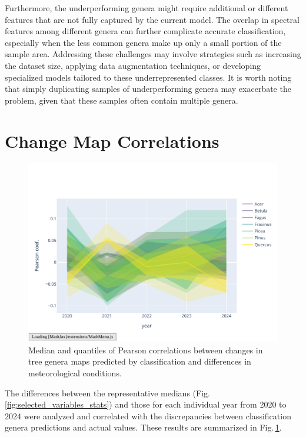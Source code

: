 Furthermore, the underperforming genera might require additional or different features that are not fully captured by the current model. The overlap in spectral features among different genera can further complicate accurate classification, especially when the less common genera make up only a small portion of the sample area. Addressing these challenges may involve strategies such as increasing the dataset size, applying data augmentation techniques, or developing specialized models tailored to these underrepresented classes. It is worth noting that simply duplicating samples of underperforming genera may exacerbate the problem, given that these samples often contain multiple genera.

\section{Change Map Correlations}

\begin{figure}[ht]
    \centering
    \includegraphics[width=0.98\linewidth, trim={10pt 20pt 10pt 40pt}, clip]{figures/figures_climate/genus_corr.pdf}
    \caption{Median and quantiles of Pearson correlations between changes in tree genera maps predicted by classification and differences in meteorological conditions.}
    \label{fig:genus_corr}
\end{figure}

The differences between the representative medians (Fig.\,\ref{fig:selected_variables_stats}) and those for each individual year from 2020 to 2024 were analyzed and correlated with the discrepancies between classification genera predictions and actual values. These results are summarized in Fig.\,\ref{fig:genus_corr}. 

